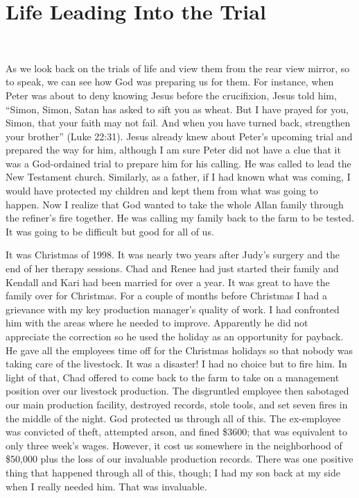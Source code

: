 \documentclass[twoside, 12pt]{book}
\begin{document}
\section{Life Leading Into the Trial}
\

As we look back on the trials of life and view them from the rear view mirror, so to speak, we can see how God was preparing us for them. For instance, when Peter was about to deny knowing Jesus before the crucifixion, Jesus told him, “Simon, Simon, Satan has asked to sift you as wheat. But I have prayed for you, Simon, that your faith may not fail. And when you have turned back, strengthen your brother” (Luke 22:31). Jesus already knew about Peter’s upcoming trial and  prepared the way for him, although I am sure Peter did not have a clue that it was a God-ordained trial to prepare him for his calling. He was called to lead the New Testament church. Similarly, as a father, if I had known what was coming, I would have protected my children and kept them from what was going to happen. Now I realize that God wanted to take the whole Allan family through the refiner’s fire together. He was calling my family back to the farm to be tested. It was going to be difficult but good for all of us. 

It was Christmas of 1998. It was nearly two years after Judy's surgery and the end of her therapy sessions. Chad and Renee had just started their family and Kendall and Kari had been married for over a year. It was great to have the family over for Christmas. For a couple of months before Christmas I had a grievance with my key production manager’s quality of work. I had confronted him with the areas where he needed to improve. Apparently he did not appreciate the correction so he used the holiday as an opportunity for payback. He gave all the employees time off for the Christmas holidays so that nobody was taking care of the livestock. It was a disaster! I had no choice but to fire him. In light of that, Chad offered to come back to the farm to take on a management position over our livestock production. The disgruntled employee then sabotaged our main production facility, destroyed records, stole tools, and set seven fires in the middle of the night. God protected us through all of this. The ex-employee was convicted of theft, attempted arson, and fined \$3600; that was equivalent to only three week’s wages. However, it cost us somewhere in the neighborhood of \$50,000 plus the loss of our invaluable production records. There was one positive thing that happened through all of this, though; I had my son back at my side when I really needed him. That was invaluable.
\end{document}
